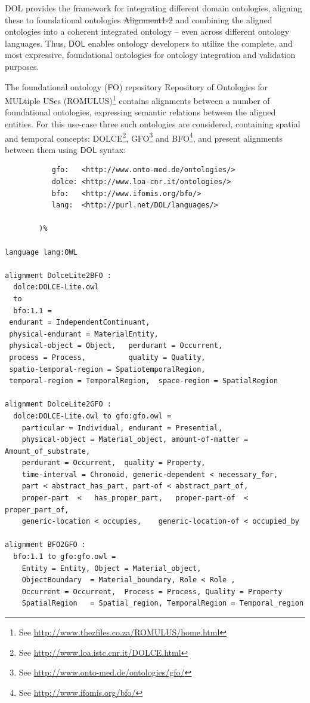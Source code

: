 \documentclass[10pt,fleqn,final]{scrreprt}
\newcommand*{\DOL}{\ensuremath{\mathsf{DOL}}\xspace}
\providecommand{\DIFadd}[1]{{\protect\color{blue}\uwave{#1}}} %
\providecommand{\DIFdel}[1]{{\protect\color{red}\sout{#1}}}                      %
\providecommand{\DIFaddbegin}{} %
\providecommand{\DIFaddend}{} %
\providecommand{\DIFdelbegin}{} %
\providecommand{\DIFdelend}{} %
\begin{document}
DOL  provides the framework for integrating different domain ontologies, aligning these to 
foundational ontologies \DIFdelbegin %
\DIFdel{Alignment1-2}%
\DIFdelend \DIFaddbegin \DIFadd{\mbox{%
\cite{DBLP:books/daglib/0032976,AlignmentAPI}
}%
}\DIFaddend and combining the aligned ontologies into a coherent 
integrated ontology -- even across different ontology languages. Thus, \DOL  enables ontology 
developers to utilize the complete, and most expressive, foundational ontologies for ontology 
integration and validation purposes. 

The foundational ontology (FO) repository Repository of Ontologies for MULtiple USes (ROMULUS)\footnote{See \url{http://www.thezfiles.co.za/ROMULUS/home.html}}
contains alignments between a number of foundational ontologies, expressing semantic relations between the aligned
entities.  For this use-case three such ontologies are considered, containing spatial and temporal concepts: DOLCE\footnote{See \url{http://www.loa.istc.cnr.it/DOLCE.html}}, GFO\footnote{See \url{http://www.onto-med.de/ontologies/gfo/}} and BFO\footnote{See \url{http://www.ifomis.org/bfo/}}, and present alignments between them 
using \DOL syntax:

\begin{lstlisting}[basicstyle=\ttfamily\footnotesize,language=dolText,escapechar=@,mathescape]
%prefix(
           gfo:   <http://www.onto-med.de/ontologies/>
           dolce: <http://www.loa-cnr.it/ontologies/>
           bfo:   <http://www.ifomis.org/bfo/>
           lang:  <http://purl.net/DOL/languages/>

        )%

language lang:OWL

alignment DolceLite2BFO :
  dolce:DOLCE-Lite.owl
  to
  bfo:1.1 =
 endurant = IndependentContinuant,
 physical-endurant = MaterialEntity,
 physical-object = Object,   perdurant = Occurrent,
 process = Process,          quality = Quality,
 spatio-temporal-region = SpatiotemporalRegion,
 temporal-region = TemporalRegion,  space-region = SpatialRegion

alignment DolceLite2GFO :
  dolce:DOLCE-Lite.owl to gfo:gfo.owl =
 	particular = Individual, endurant = Presential,
 	physical-object = Material_object, amount-of-matter = Amount_of_substrate,
 	perdurant = Occurrent, 	quality = Property,
 	time-interval = Chronoid, generic-dependent < necessary_for,
 	part < abstract_has_part, part-of < abstract_part_of,
 	proper-part  <	 has_proper_part,  	proper-part-of  < proper_part_of,
 	generic-location < occupies, 	generic-location-of < occupied_by

alignment BFO2GFO :
  bfo:1.1 to gfo:gfo.owl =
	Entity = Entity, Object = Material_object,
	ObjectBoundary  = Material_boundary, Role < Role ,
 	Occurrent = Occurrent, 	Process = Process, Quality = Property 
 	SpatialRegion 	= Spatial_region, TemporalRegion = Temporal_region 	
\end{lstlisting}
\end{document}
